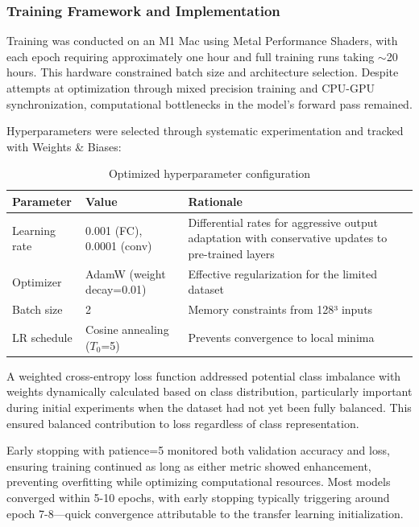 \documentclass[11pt, a4paper]{article}
\begin{document}
\subsubsection{Training Framework and Implementation}

Training was conducted on an M1 Mac using Metal Performance Shaders, with each epoch requiring approximately one hour and full training runs taking $\sim$20 hours. This hardware constrained batch size and architecture selection. Despite attempts at optimization through mixed precision training and CPU-GPU synchronization, computational bottlenecks in the model's forward pass remained.

Hyperparameters were selected through systematic experimentation and tracked with Weights \& Biases:

\begin{table}[htbp]
\centering
\begin{tabular}{|l|l|p{5.5cm}|}
\hline
\textbf{Parameter} & \textbf{Value} & \textbf{Rationale} \\
\hline
Learning rate & 0.001 (FC), 0.0001 (conv) & Differential rates for aggressive output adaptation with conservative updates to pre-trained layers \\
\hline
Optimizer & AdamW (weight decay=0.01) & Effective regularization for the limited dataset \\
\hline
Batch size & 2 & Memory constraints from 128³ inputs \\
\hline
LR schedule & Cosine annealing ($T_0$=5) & Prevents convergence to local minima \\
\hline
\end{tabular}
\caption{Optimized hyperparameter configuration}
\end{table}

A weighted cross-entropy loss function addressed potential class imbalance with weights dynamically calculated based on class distribution, particularly important during initial experiments when the dataset had not yet been fully balanced. This ensured balanced contribution to loss regardless of class representation.


Early stopping with patience=5 monitored both validation accuracy and loss, ensuring training continued as long as either metric showed enhancement, preventing overfitting while optimizing computational resources. Most models converged within 5-10 epochs, with early stopping typically triggering around epoch 7-8—quick convergence attributable to the transfer learning initialization.
\end{document}
